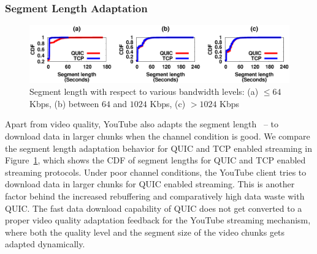 \subsubsection{Segment Length Adaptation}

\begin{figure}[!t]
	\captionsetup[subfigure]{}
	\begin{center}
        \includegraphics[width=\linewidth]{img/plotdata/CDF/Segment/plot_segment_bucket123}
		\caption{\label{fig:segment}Segment length with respect to various bandwidth levels: (a) $\leq 64$ Kbps, (b)  between $64$ and $1024$ Kbps, (c) $> 1024$ Kbps}
	\end{center}
\end{figure}


Apart from video quality, YouTube also adapts the segment length~\cite{mondal2017youtube} -- to download data in larger chunks when the channel condition is good. We compare the segment length adaptation behavior for QUIC and TCP enabled streaming in Figure~\ref{fig:segment}, which shows the CDF of segment lengths for QUIC and TCP enabled streaming protocols. 
Under poor channel conditions, the YouTube client tries to download data in larger chunks for QUIC enabled streaming. This is another factor behind the increased rebuffering and comparatively high data waste with QUIC. The fast data download capability of QUIC does not get converted to a proper video quality adaptation feedback for the YouTube streaming mechanism, where both the quality level and the segment size of the video chunks gets adapted dynamically. 

